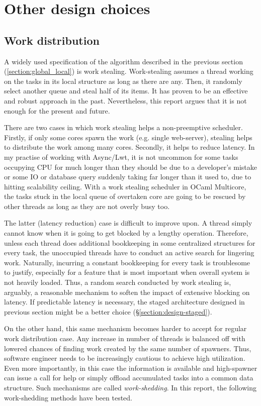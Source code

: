 \documentclass[12pt,a4paper,twoside]{report}
\begin{document}
\section{Other design choices}


\subsection{Work distribution}
\label{section:work-distribution}
A widely used specification of the algorithm described in the previous section (\ref{section:global_local}) is work stealing. Work-stealing assumes a thread working on the tasks in its local structure as long as there are any. Then, it randomly select another queue and steal half of its items. It has proven to be an effective and robust approach in the past. Nevertheless, this report argues that it is not enough for the present and future. 

There are two cases in which work stealing helps a non-preemptive scheduler. Firstly, if only some cores spawn the work (e.g. single web-server), stealing helps to distribute the work among many cores. Secondly, it helps to reduce latency. In my practise of working with Async/Lwt, it is not uncommon for some tasks occupying CPU for much longer than they should be due to a developer's mistake or some IO or database query suddenly taking far longer than it used to, due to hitting scalability ceiling. With a work stealing scheduler in OCaml Multicore, the tasks stuck in the local queue of overtaken core are going to be rescued by other threads as long as they are not overly busy too. 

The latter (latency reduction) case is difficult to improve upon. A thread simply cannot know when it is going to get blocked by a lengthy operation. Therefore, unless each thread does additional bookkeeping in some centralized structures for every task, the unoccupied threads have to conduct an active search for lingering work. Naturally, incurring a constant bookkeeping for every task is troublesome to justify, especially for a feature that is most important when overall system is not heavily loaded. Thus, a random search conducted by work stealing is, arguably, a reasonable mechanism to soften the impact of extensive blocking on latency. If predictable latency is necessary, the staged architecture designed in previous section might be a better choice (\S\ref{section:design-staged}).

On the other hand, this same mechanism becomes harder to accept for regular work distribution case. Any increase in number of threads is balanced off with lowered chances of finding work created by the same number of spawners. Thus, software engineer needs to be increasingly cautious to achieve high utilization. Even more importantly, in this case the information is available and high-spawner can issue a call for help or simply offload accumulated tasks into a common data structure. Such mechanisms are called \textit{work-shedding}. In this report, the following work-shedding methods have been tested. 
\end{document}
